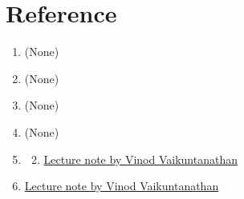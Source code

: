 


\clearpage
{}


\clearpage
{}


\clearpage
{}


\clearpage
{}


\clearpage
{}








\clearpage
\section*{Reference}
\begin{enumerate}
    \item[P1] (None)
    \item[P2] (None)
    \item[P3] (None)
    \item[P4] (None)
    \item[P5] \begin{enumerate}[label=(\roman*)]
        \setcounter{enumii}{1}
        \item \href{https://people.csail.mit.edu/vinodv/6876-Fall2015/L13.pdf}{Lecture note by Vinod Vaikuntanathan}
    \end{enumerate}
    \item[P6] \href{https://people.csail.mit.edu/vinodv/6876-Fall2015/L13.pdf}{Lecture note by Vinod Vaikuntanathan}
\end{enumerate}